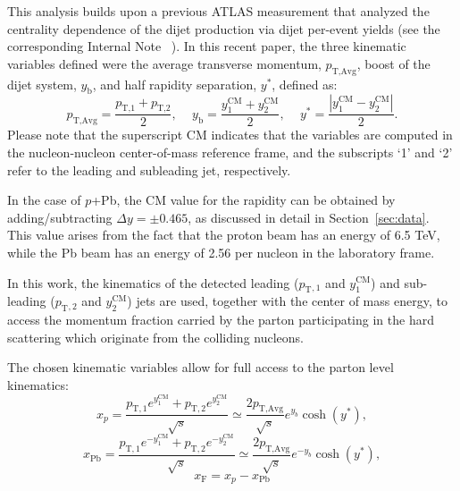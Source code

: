 \documentclass[NOTE, atlasdraft=true, texlive=2020, UKenglish]{atlasdoc}
\newcommand{\PT}{$p_{\text{T}}$}
\newcommand{\PTAE}{p_{\text{T,Avg}}}
\newcommand{\PTA}{$p_{\text{T,Avg}}$}
\newcommand{\YSTAR}{$y^{*}$}
\newcommand{\YBOOST}{$y_{\text{b}}$}
\newcommand{\pxPb}{$p$+Pb}
\newcommand{\TN}[1]{ \text{#1} }
\begin{document}
This analysis builds upon a previous ATLAS measurement that analyzed the centrality dependence of the dijet production via dijet per-event yields (see the corresponding Internal Note ~\cite{Longo:2860813}). 
In this recent paper, the three kinematic variables defined were the average transverse momentum, \PTA, boost of the dijet system, \YBOOST, and half rapidity separation, \YSTAR, defined as:
\begin{equation}
\label{eq:kinevar_definition} 
\PTAE = \frac{p_{\TN{T,1}}+p_{\TN{T,2}}}{2}, \, \quad y_{\TN{b}} = \frac{ y_1^{\TN{CM}}+y_2^{\TN{CM}} }{2}, \, \quad y^{*} = \frac{| y_1^\TN{CM}-y_2^\TN{CM} | }{2} .
\end{equation}
Please note that the superscript CM indicates that the variables are computed in the nucleon-nucleon center-of-mass reference frame, and the subscripts `1' and `2' refer to the leading and subleading jet, respectively. 

In the case of \pxPb, the CM value for the rapidity can be obtained by adding/subtracting $\Delta y = \pm 0.465$, as discussed in detail in Section~\ref{sec:data}.
This value arises from the fact that
 the proton beam has an energy of 6.5 TeV, while the Pb beam has an energy of 2.56 per nucleon in the laboratory frame.



In this work, the kinematics of the detected leading (\PT{$_{,1}$} and $y^\TN{CM}_{1}$) and sub-leading (\PT{$_{,2}$} and $y^\TN{CM}_{2}$) jets are used, together with the center of mass energy, to access the momentum fraction carried by the parton participating in the hard scattering which originate from the colliding nucleons. 

The chosen kinematic variables allow for full access to the parton level kinematics:
\begin{equation}
\label{eq:xp}
x_p = 
\frac{ p_{\TN{T},1}e^{y^\TN{CM}_{1}} 
+ 
p_{\TN{T},2}e^{y^\TN{CM}_{2}}}
{\sqrt{s}}
\simeq
\frac{2p_{\TN{T},\TN{Avg}}}
{\sqrt{s}}
e^{y_b}
\cosh(y^{*
}),
\end{equation}
\begin{equation}
\label{eq:xPb}
x_{\TN{Pb}} 
= 
\frac{ p_{\TN{T},1}e^{-y^\TN{CM}_{1}} 
+ 
p_{\TN{T},2}e^{-y^\TN{CM}_{2}}}
{\sqrt{s}} 
\simeq
\frac{2p_{\TN{T},\TN{Avg}}}
{\sqrt{s}}
e^{-y_b}
\cosh(y^{*}),
\end{equation}
\begin{equation}
\label{eq:xF}
x_\mathrm{F} = x_p-x_{\TN{Pb}}
\end{equation}
\end{document}
